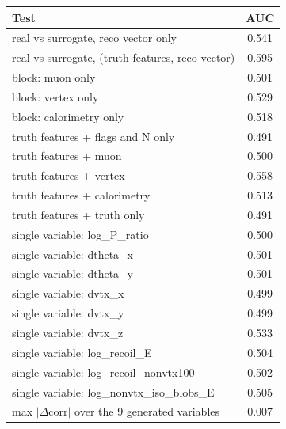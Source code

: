 \begin{tabular}{lc}
\toprule
Test & AUC \\
\midrule
real vs surrogate, reco vector only & 0.541 \\
real vs surrogate, (truth features, reco vector) & 0.595 \\
\midrule
block: muon only & 0.501 \\
block: vertex only & 0.529 \\
block: calorimetry only & 0.518 \\
truth features + flags and N only & 0.491 \\
truth features + muon & 0.500 \\
truth features + vertex & 0.558 \\
truth features + calorimetry & 0.513 \\
truth features + truth only & 0.491 \\
single variable: log\_P\_ratio & 0.500 \\
single variable: dtheta\_x & 0.501 \\
single variable: dtheta\_y & 0.501 \\
single variable: dvtx\_x & 0.499 \\
single variable: dvtx\_y & 0.499 \\
single variable: dvtx\_z & 0.533 \\
single variable: log\_recoil\_E & 0.504 \\
single variable: log\_recoil\_nonvtx100 & 0.502 \\
single variable: log\_nonvtx\_iso\_blobs\_E & 0.505 \\
\midrule
max $|\Delta$corr$|$ over the 9 generated variables & 0.007 \\
\bottomrule
\end{tabular}
